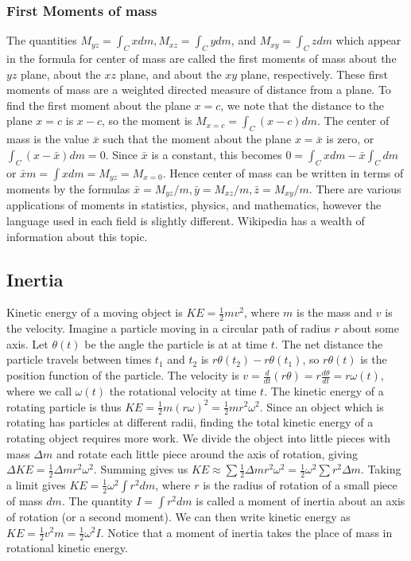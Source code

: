 \subsubsection{First Moments of mass}
The quantities $M_{yz}=\int_C x dm, M_{xz}=\int_C y dm$, and  $M_{xy}=\int_C z
dm$ which appear in the formula for center of mass are called the
first moments of mass about the $yz$ plane, about the $xz$ plane, and
about the $xy$ plane, respectively. These first moments of mass are a
weighted directed measure of distance from a plane. 
To find the first moment about the plane $x=c$, we note that the
distance to the plane $x=c$ is $x-c$, so the moment is $M_{x=c}=\int_C
(x-c)dm$.  The center of mass is the value $\bar x$ such that the
moment about the plane $x=\bar x$ is zero, or $\int_C(x-\bar x)dm = 0$.
Since $\bar x$ is a constant, this becomes $0=\int_C x dm - \bar x \int_C dm$
or $\bar x m = \int x dm=M_{yz}=M_{x=0}$. Hence center of mass can be
written in terms of moments by the formulas
$\bar x =M_{yz}/m,\bar y =M_{xz}/m, \bar z = M_{xy}/m$. 
There are various applications of moments in statistics, physics, and
mathematics, however the language used in each field is slightly
different. Wikipedia has a wealth of information about this topic.

\subsection{Inertia}

Kinetic energy of a moving object is $\displaystyle KE=\frac{1}{2}
mv^2$, where $m$ is the mass and $v$ is the velocity. Imagine a
particle moving in a circular path of radius $r$ about some axis.  Let
$\theta(t)$ be the angle the particle is at at time $t$.  The net distance
the particle travels between times $t_1$ and $t_2$ is
$r\theta(t_2)-r\theta(t_1)$, so $r\theta(t)$ is the position function of the
particle.  The velocity is {$ v=\frac{d}{dt}(r\theta)=r\frac{d\theta}{dt} =
  r\omega(t) $}, where we call $\omega(t)$ the rotational velocity at time
$t$. The kinetic energy of a rotating particle is thus {$\displaystyle
  KE=\frac{1}{2} m(r\omega)^2 = \frac{1}{2} m r^2\omega^2$}. Since an object
which is rotating has particles at different radii, finding the total
kinetic energy of a rotating object requires more work.  We divide the
object into little pieces with mass {$\Delta m$} and rotate each little
piece around the axis of rotation, giving {$\displaystyle \Delta KE=
  \frac{1}{2} \Delta m r^2 \omega^2$}.  Summing gives us {$\displaystyle KE \approx \sum
  \frac{1}{2} \Delta m r^2 \omega^2 = \frac{1}{2} \omega^2 \sum r^2 \Delta m$}. Taking a
limit gives {$\displaystyle KE = \frac{1}{2} \omega^2 \int r^2 dm$}, where
{$r$} is the radius of rotation of a small piece of mass $dm$.  The
quantity {$I=\int r^2 dm$} is called a moment of inertia about an axis of
rotation (or a second moment). We can then write kinetic energy as
$KE=\frac{1}{2}v^2 m = \frac{1}{2}\omega^2 I$. Notice that a moment of
inertia takes the place of mass in rotational kinetic energy.

